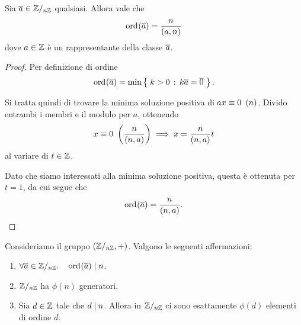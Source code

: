 \begin{proposition}
     \label{prop:ord_in_Z/nZ}
    Sia $\eqcl a \in \Zmod n$ qualsiasi. Allora vale che \[
        \ord{\eqcl a} = \frac{n}{\mcd{a}{n}}    
    \] dove $a \in \mathbb{Z}$ è un rappresentante della classe $\eqcl a$.
\end{proposition}
\begin{proof}
    Per definizione di ordine \[
        \ord{\eqcl a} = \min \set{k > 0 \suchthat k \eqcl a = \eqcl 0}.    
    \]

    Si tratta quindi di trovare la minima soluzione positiva di $ax \equiv 0 \ \left(n\right)$. Divido entrambi i membri e il modulo per $a$, ottenendo \[
        x \equiv 0 \ \left(\frac{n}{\left(n, a\right)}\right) \implies x = \frac{n}{\left(n, a\right)}t    
    \] al variare di $t \in \mathbb{Z}$. 

    Dato che siamo interessati alla minima soluzione positiva, questa è ottenuta per $t = 1$, da cui segue che \[
        \ord{\eqcl a} = \frac{n}{\mcd{n}{a}}. \qedhere    
    \]
\end{proof}

\begin{corollary}
    \label{cor:cons_ord_in_Z/nZ}
    Consideriamo il gruppo $(\mathbb{Z}/_{n\mathbb{Z}}, +)$. Valgono le seguenti affermazioni:
    \begin{enumerate}[label={(\roman*)}, ref={\theproposition: (\roman*)}]
        \item \label{cor:cons_ord_in_Z/nZ:ord_a_div_n} $\forall \eqcl{a} \in \Zmod{n}. \quad \ord{\eqcl a} \divides n$.
        \item \label{cor:cons_ord_in_Z/nZ:phi(n)_gen} $\mathbb{Z}/_{n\mathbb{Z}}$ ha $\phi(n)$ generatori.
        \item \label{cor:cons_ord_in_Z/nZ:phi(d)_el} Sia $d \in \mathbb{Z}$ tale che $d \mid n$. Allora in $\mathbb{Z}/_{n\mathbb{Z}}$ ci sono esattamente $\phi(d)$ elementi di ordine $d$.
    \end{enumerate}
\end{corollary}

